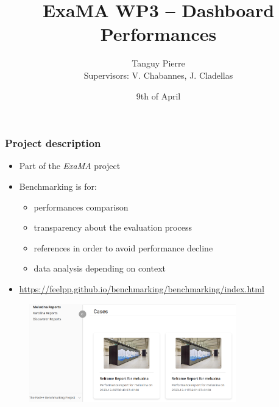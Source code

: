 \documentclass[10pt]{beamer}
\title{\textbf{ExaMA WP3 -- Dashboard Performances}}
\author[Tanguy PIERRE]{Tanguy Pierre\\[1cm] \small{Supervisors: V. Chabannes, J. Cladellas}}
\institute{University of Strasbourg}
\date{9th of April}
\begin{document}
\frame{\titlepage}


\begin{frame}
    \frametitle{\textbf{Project description}}

    \begin{itemize}
        \addtolength{\itemsep}{10pt}
        \item Part of the \textit{ExaMA} project
        \item Benchmarking is for:
        \begin{itemize}
            \item performances comparison
            \item transparency about the evaluation process
            \item references in order to avoid performance decline
            \item data analysis depending on context
        \end{itemize}
        \item {\footnotesize\url{https://feelpp.github.io/benchmarking/benchmarking/index.html}}
    \end{itemize}
    \begin{figure}
        \centering
        \includegraphics[width=0.8\textwidth]{../illustrations/feelpp-dashboard.png}
      \end{figure}
\end{frame}
\end{document}
